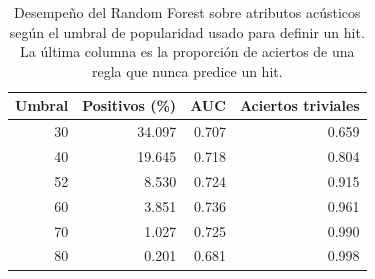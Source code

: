 \begin{table}[htbp]
\caption{Desempeño del Random Forest sobre atributos acústicos según el umbral de popularidad usado para definir un hit. La última columna es la proporción de aciertos de una regla que nunca predice un hit.}
\label{tab:robustez}
\begin{tabular}{rrrr}
\toprule
Umbral & Positivos (\%) & AUC & Aciertos triviales \\
\midrule
30 & 34.097 & 0.707 & 0.659 \\
40 & 19.645 & 0.718 & 0.804 \\
52 & 8.530 & 0.724 & 0.915 \\
60 & 3.851 & 0.736 & 0.961 \\
70 & 1.027 & 0.725 & 0.990 \\
80 & 0.201 & 0.681 & 0.998 \\
\bottomrule
\end{tabular}
\end{table}
